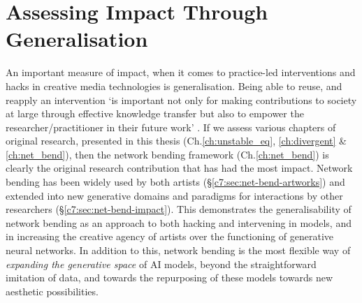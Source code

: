 \section{Assessing Impact Through Generalisation}
\label{c8:sec:generalisation}

An important measure of impact, when it comes to practice-led interventions and hacks in creative media technologies is generalisation.
Being able to reuse, and reapply an intervention `is important not only for making contributions to society at large through effective knowledge transfer but also to empower the researcher/practitioner in their future work' \citep{brown2009integrating}.
If we assess various chapters of original research, presented in this thesis (Ch.\ref{ch:unstable_eq}, \ref{ch:divergent} \& \ref{ch:net_bend}), then the network bending framework (Ch.\ref{ch:net_bend}) is clearly the original research contribution that has had the most impact. 
Network bending has been widely used by both artists (\S \ref{c7:sec:net-bend-artworks}) and extended into new generative domains and paradigms for interactions by other researchers (\S \ref{c7:sec:net-bend-impact}).
This demonstrates the generalisability of network bending as an approach to both hacking and intervening in models, and in increasing the creative agency of artists over the functioning of generative neural networks.
In addition to this, network bending is the most flexible way of \textit{expanding the generative space} of AI models, beyond the straightforward imitation of data, and towards the repurposing of these models towards new aesthetic
possibilities. 
